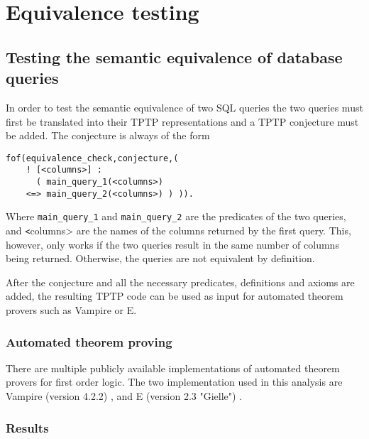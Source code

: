 \documentclass[magisterska,en]{pracamgr}
\newcommand{\code}[1]{\texttt{#1}}
\begin{document}




\chapter{Equivalence testing}

\section{Testing the semantic equivalence of database queries}

In order to test the semantic equivalence of two SQL queries the two queries must first be translated into their TPTP representations and a TPTP conjecture must be added. The conjecture is always of the form
\begin{lstlisting}
fof(equivalence_check,conjecture,(
    ! [<columns>] :
      ( main_query_1(<columns>)
    <=> main_query_2(<columns>) ) )). 
\end{lstlisting}
Where \code{main_query_1} and \code{main_query_2} are the predicates of the two queries, and \code<columns> are the names of the columns returned by the first query. This, however, only works if the two queries result in the same number of columns being returned. Otherwise, the queries are not equivalent by definition.

After the conjecture and all the necessary predicates, definitions and axioms are added, the resulting TPTP code can be used as input for automated theorem provers such as Vampire or E.

\subsection{Automated theorem proving}


There are multiple publicly available implementations of automated theorem provers for first order logic. The two implementation used in this analysis are Vampire (version 4.2.2) \cite{vampire}, and E (version 2.3 "Gielle") \cite{eprover}. 


\subsection{Results}
\end{document}
